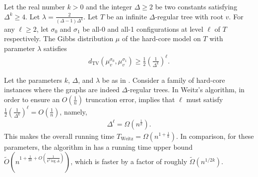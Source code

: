 \documentclass{theoretics}
\newcommand{\tp}[1]{{\left( #1 \right)}}
\newcommand{\dTV}{d_{\mathrm{TV}}}
\begin{document}
\begin{lemma}\label{lemma-inf-lower}
Let the real number $k > 0$ and the integer $\Delta \geq 2$ be two constants satisfying $\Delta^k \geq 4$.
Let  $\lambda = \frac{2}{(\Delta - 1)\Delta^{k}}$.
Let $T$ be an infinite $\Delta$-regular tree with root $v$.
For any $\ell \geq 2$, let $\sigma_0$ and $\sigma_1$ be all-0 and all-1 configurations at level $\ell$ of $T$ respectively.
The Gibbs distribution $\mu$ of the hard-core model on $T$ with parameter $\lambda$ satisfies 
\begin{align*}
	\dTV(\mu_v^{\sigma_0},\mu_v^{\sigma_1}) \geq \frac{1}{2}\tp{\frac{1}{\Delta^k}}^{\ell}.
\end{align*}
\end{lemma}

Let the parameters $k$, $\Delta$, and $\lambda$ be as in .
%
Consider a family of hard-core instances where the graphs are indeed $\Delta$-regular trees.
%
In Weitz's algorithm, in order to ensure an $O(\frac{1}{n})$ truncation error,
 implies that $\ell$ must satisfy $\frac{1}{2}\tp{\frac{1}{\Delta^k}}^{\ell} = O(\frac{1}{n})$,
namely,
\begin{align*}
	\Delta^\ell = \Omega(n^{\frac{1}{k}}).
\end{align*}
This makes the overall running time $T_{\mathrm{Weitz}}  = \Omega(n^{1 + \frac{1}{k}})$.
In comparison, for these parameters, the algorithm in  has a running time upper bound $\widetilde{O}\left(n^{1+\frac{1}{2k}+O(\frac{1}{k^2\log\Delta})}\right)$,
which is faster by a factor of roughly $\widetilde{\Omega}(n^{1/2k})$.


\end{document}
